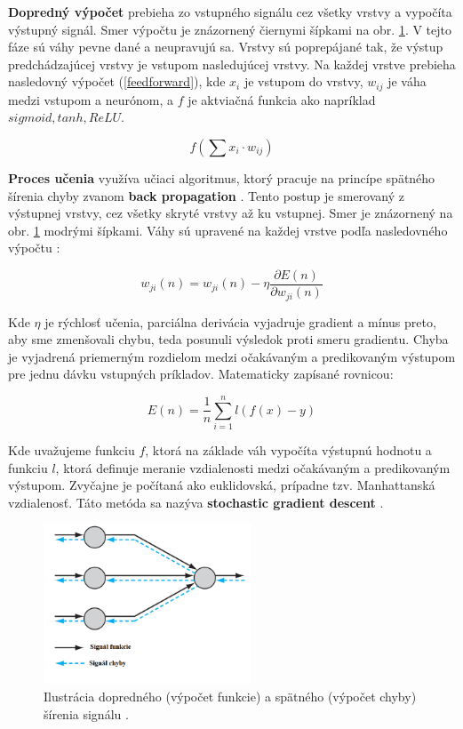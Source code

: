 \textbf{Dopredný výpočet} prebieha zo vstupného signálu cez všetky vrstvy a vypočíta výstupný signál. Smer výpočtu je znázornený čiernymi šípkami na obr. \ref{img:12backprop}. V tejto fáze sú váhy pevne dané a neupravujú sa. Vrstvy sú poprepájané tak, že výstup predchádzajúcej vrstvy je vstupom nasledujúcej vrstvy. Na každej vrstve prebieha nasledovný výpočet (\ref{feedforward}), kde $x_i$ je vstupom do vrstvy, $w_{ij}$ je váha medzi vstupom a neurónom, a $f$ je aktviačná funkcia ako napríklad $sigmoid, tanh, ReLU$.

\begin{equation}\label{feedforward}
    f\left( \sum{x_i \cdot w_{ij}} \right)
\end{equation}

\textbf{Proces učenia} využíva učiaci algoritmus, ktorý pracuje na princípe spätného šírenia chyby zvanom \textbf{back propagation} \cite{haykin2009neural}. Tento postup je smerovaný z výstupnej vrstvy, cez všetky skryté vrstvy až ku vstupnej. Smer je znázornený na obr. \ref{img:12backprop} modrými šípkami. Váhy sú upravené na každej vrstve podľa nasledovného výpočtu \cite{haykin2009neural}:

\begin{equation}\label{deltarule}
    w_{ji}(n) = w_{ji}(n)-\eta\frac{\partial{E(n)}}{\partial{w_{ji}(n)}}
\end{equation}

Kde $\eta$ je rýchlosť učenia, parciálna derivácia vyjadruje gradient a mínus preto, aby sme zmenšovali chybu, teda posunuli výsledok proti smeru gradientu. 
Chyba je vyjadrená priemerným rozdielom medzi očakávaným a predikovaným výstupom pre jednu dávku vstupných príkladov. Matematicky zapísané rovnicou:

\begin{equation}\label{eqn:SGDerror}
    {
        E(n) = \frac{1}{n}\sum_{i=1}^{n}{l(f(x) - y)}
    }
\end{equation}

Kde uvažujeme funkciu $f$, ktorá na základe váh vypočíta výstupnú hodnotu a funkciu $l$, ktorá definuje meranie vzdialenosti medzi očakávaným a predikovaným výstupom. Zvyčajne je počítaná ako euklidovská, prípadne tzv. Manhattanská vzdialenosť. Táto metóda sa nazýva \textbf{stochastic gradient descent} \cite{bottou-tricks-2012}.

\begin{figure}[H]
	\begin{center}
		\includegraphics[height=180px]{images/12backprop.png}
		\caption{Ilustrácia dopredného (výpočet funkcie) a spätného (výpočet chyby) šírenia signálu \cite{haykin2009neural}. }
		\label{img:12backprop}
	\end{center}
\end{figure}

